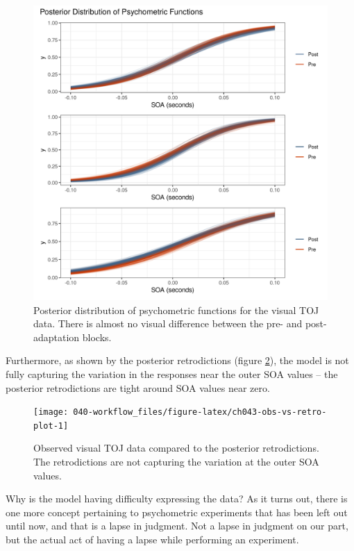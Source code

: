 \documentclass[11pt, oneside, openany]{scrbook}
\begin{document}
\begin{figure}

{\centering \includegraphics[width=0.85\linewidth]{figures/ch043-Iron-Intensive} 

}

\caption{Posterior distribution of psychometric functions for the visual TOJ data. There is almost no visual difference between the pre- and post-adaptation blocks.}\label{fig:ch043-Iron-Intensive}
\end{figure}

Furthermore, as shown by the posterior retrodictions (figure \ref{fig:ch043-obs-vs-retro-plot}), the model is not fully capturing the variation in the responses near the outer SOA values -- the posterior retrodictions are tight around SOA values near zero.

\begin{figure}

{\centering \texttt{[image: 040-workflow\_files/figure-latex/ch043-obs-vs-retro-plot-1]} 

}

\caption{Observed visual TOJ data compared to the posterior retrodictions. The retrodictions are not capturing the variation at the outer SOA values.}\label{fig:ch043-obs-vs-retro-plot}
\end{figure}

Why is the model having difficulty expressing the data? As it turns out, there is one more concept pertaining to psychometric experiments that has been left out until now, and that is a lapse in judgment. Not a lapse in judgment on our part, but the actual act of having a lapse while performing an experiment.
\end{document}
